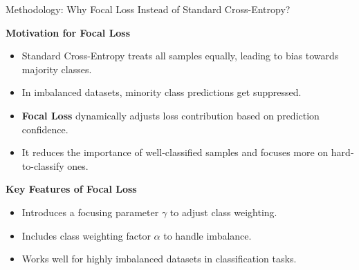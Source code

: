 \begin{frame}{Methodology: Why Focal Loss Instead of Standard Cross-Entropy?}

    \textbf{\large Motivation for Focal Loss}
    \vspace{5pt}
    \begin{itemize}
        \item Standard Cross-Entropy treats all samples equally, leading to bias towards majority classes.
        \item In imbalanced datasets, minority class predictions get suppressed.
        \item \textbf{Focal Loss} dynamically adjusts loss contribution based on prediction confidence.
        \item It reduces the importance of well-classified samples and focuses more on hard-to-classify ones.
    \end{itemize}

    \vspace{10pt}
    \textbf{\large Key Features of Focal Loss}
    \vspace{5pt}
    \begin{itemize}
        \item Introduces a focusing parameter \( \gamma \) to adjust class weighting.
        \item Includes class weighting factor \( \alpha \) to handle imbalance.
        \item Works well for highly imbalanced datasets in classification tasks.
    \end{itemize}

\end{frame}
